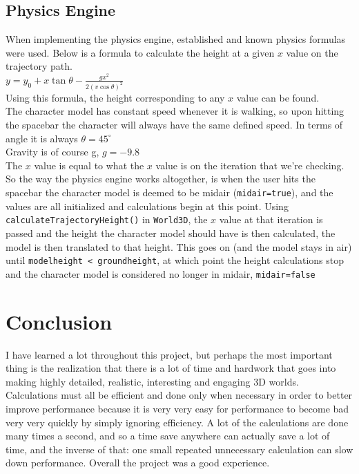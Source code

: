 \documentclass {article}
\begin{document}
\subsection{Physics Engine}
When implementing the physics engine, established and known physics formulas were used. Below is a formula to calculate the height at a given $x$ value on the trajectory path.\\ \newline
$y = y_0 + x \tan \theta - \frac {gx^2}{2(v\cos\theta)^2}$\\ \newline
Using this formula, the height corresponding to any $x$ value can be found.\\
The character model has constant speed whenever it is walking, so upon hitting the spacebar the character will always have the same defined speed. In terms of angle it is always $\theta = 45^{\circ}$\\
Gravity is of course g, $g = -9.8$\\
The $x$ value is equal to what the $x$ value is on the iteration that we're checking. So the way the physics engine works altogether, is when the user hits the spacebar the character model is deemed to be midair (\texttt{midair=true}), and the values are all initialized and calculations begin at this point. Using \newline \texttt{calculateTrajectoryHeight()} in \texttt{World3D}, the $x$ value at that iteration is passed and the height the character model should have is then calculated, the model is then translated to that height. This goes on (and the model stays in air) until \texttt{modelheight < groundheight}, at which point the height calculations stop and the character model is considered no longer in midair, \texttt{midair=false}

\newpage
\section{Conclusion}
I have learned a lot throughout this project, but perhaps the most important thing is the realization that there is a lot of time and hardwork that goes into making highly detailed, realistic, interesting and engaging 3D worlds. Calculations must all be efficient and done only when necessary in order to better improve performance because it is very very easy for performance to become bad very very quickly by simply ignoring efficiency. A lot of the calculations are done many times a second, and so a time save anywhere can actually save a lot of time, and the inverse of that: one small repeated unnecessary calculation can slow down performance. Overall the project was a good experience.
\end{document}
